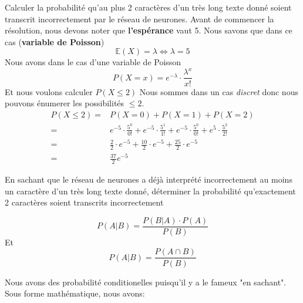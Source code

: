 \begin{exo}

  \begin{subexo}{Calculer la probabilité qu'au plus 2 caractères d'un très long texte
      donné soient transcrit incorrectement par le réseau de neurones.}
    Avant de commencer la résolution, nous devons noter que \textbf{l'espérance} vaut 5.
    Nous savons que dans ce cas (\textbf{variable de Poisson})
    \[
      \mathbb{E}(X) = \lambda \iff \lambda = 5
    \]
    Nous avons dans le cas d'une variable de Poisson
    \[
      P(X=x) = e^{-\lambda} \cdot \frac{\lambda^x}{x!}
    \]
    Et nous voulons calculer $P(X \le 2)$
    Nous sommes dans un cas \textit{discret} donc nous pouvons
    énumerer les possibilités $\le 2$.
    \begin{align*}
      P(X\le 2) = & P(X=0) + P(X=1) + P(X=2)                                                                                             \\
      =           & e^{-5} \cdot \frac{5^0}{0!} + e^{-5} \cdot \frac{5^1}{1!} + e^{-5} \cdot \frac{5^0}{0!} + e^{5} \cdot \frac{5^2}{2!} \\
      =           & \frac{2}{2} \cdot e^{-5} + \frac{10}{2}  \cdot e^{-5} + \frac{25}{2}\cdot e^{-5}                                     \\
      =           & \frac{37}{2}e^{-5}
    \end{align*}
  \end{subexo}
  \begin{subexo}{En sachant que le réseau de neurones a déjà interprété incorrectement au moins un caractère
      d'un très long texte donné, déterminer la probabilité qu'exactement 2 caractères soient
      transcrits incorrectement}

    \begin{equation}
      P(A|B) = \frac{P(B|A) \cdot P(A)}{P(B)}
    \end{equation}
    Et
    \begin{equation}
      P(A|B) = \frac{P(A \cap B)}{P(B)}
    \end{equation}

    Nous avons des probabilité conditionelles puisqu'il y a le fameux "en sachant".
    Sous forme mathématique, nous avons:


\end{subexo}
\end{exo}
